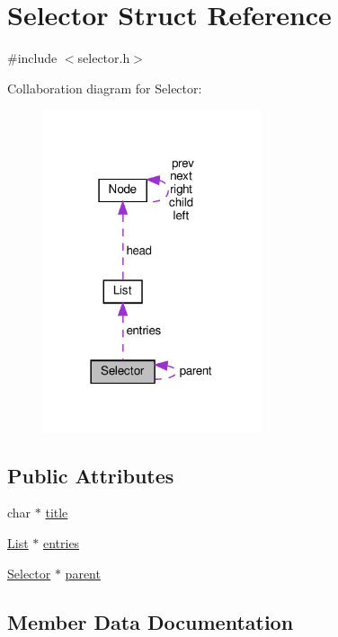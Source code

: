 \hypertarget{structSelector}{}\section{Selector Struct Reference}
\label{structSelector}


{\ttfamily \#include $<$selector.\+h$>$}



Collaboration diagram for Selector\+:\nopagebreak
\begin{figure}[H]
\begin{center}
\leavevmode
\includegraphics[width=182pt]{structSelector__coll__graph}
\end{center}
\end{figure}
\subsection*{Public Attributes}
\begin{DoxyCompactItemize}
\item 
char $\ast$ \hyperlink{structSelector_acbfa3c726e4642bb73866e111c977580}{title}
\item 
\hyperlink{structList}{List} $\ast$ \hyperlink{structSelector_ad83f9e77b597630270e0fa403fcd25ca}{entries}
\item 
\hyperlink{structSelector}{Selector} $\ast$ \hyperlink{structSelector_a628decf5829be812d3817aa5c98ac0e3}{parent}
\end{DoxyCompactItemize}


\subsection{Member Data Documentation}
\mbox{\label{structSelector_ad83f9e77b597630270e0fa403fcd25ca}} 
